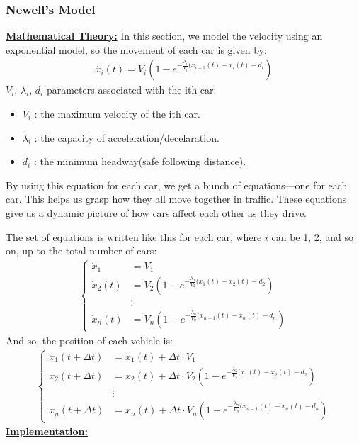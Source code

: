 \documentclass{article}
\begin{document}
		\subsubsection{Newell's Model}
		\textbf{\underline{Mathematical Theory:}}
		In this section, we model the velocity using an exponential model, so the movement of each car is given by:
		\begin{align*}
			\dot{x_i}(t) =V_i(1-e^{-\frac{\lambda_i}{V_i}(x_{i-1}(t) - x_i(t) - d_i})
		\end{align*} 
		$V_i$, $\lambda_i$, $d_i$ parameters associated with the ith car:
		\begin{itemize}
			\item $V_i$ : the maximum velocity of the ith car.
			\item $\lambda_i$ : the capacity of acceleration/decelaration.
			\item $d_i$ : the minimum headway(safe following distance). 
		\end{itemize}
		By using this equation for each car, we get a bunch of equations—one for each car. This helps us grasp how they all move together in traffic. These equations give us a dynamic picture of how cars affect each other as they drive.\newline
		
		The set of equations is written like this for each car, where $i$ can be 1, 2, and so on, up to the total number of cars:
		\begin{align*}
			\left\{
			\begin{array}{ll}
				\dot{x}_1 &= V_1 \\
				\dot{x}_2(t) &= V_2(1-e^{-\frac{\lambda_2}{V_2}(x_{1}(t) - x_2(t) - d_2}) \\
				&\vdots \\
				\dot{x}_n(t) &= V_n(1-e^{-\frac{\lambda_n}{V_n}(x_{n-1}(t) - x_n(t) - d_n})
			\end{array}
			\right.
		\end{align*}
		\newline
		And so, the position of each vehicle is:
		\begin{align*}
			\left\{
			\begin{array}{ll}
				x_1(t + \Delta t) &= x_1(t) + \Delta t \cdot  V_1\\
				x_2(t + \Delta t) &= x_2(t) + \Delta t \cdot V_2(1-e^{-\frac{\lambda_2}{V_2}(x_{1}(t) - x_2(t) - d_2}) \\
				&\vdots \\
				x_n(t + \Delta t) &= x_n(t) + \Delta t \cdot V_n(1-e^{-\frac{\lambda_n}{V_n}(x_{n-1}(t) - x_n(t) - d_n})
			\end{array}
			\right.
		\end{align*}
		\newpage
		\textbf{\underline{Implementation:}} \newline\newline
		
\end{document}
